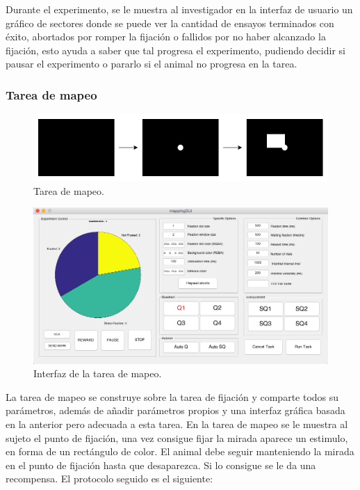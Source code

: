 \documentclass[conference]{IEEEtran}
\begin{document}
Durante el experimento, se le muestra al investigador en la interfaz de usuario un gráfico de sectores donde se puede ver la cantidad de ensayos terminados con éxito, abortados por romper la fijación o fallidos por no haber alcanzado la fijación, esto ayuda a saber que tal progresa el experimento, pudiendo decidir si pausar el experimento o pararlo si el animal no progresa en la tarea.

\subsubsection*{Tarea de mapeo}

\begin{figure}[bp]
\centerline{\includegraphics[width=\linewidth]{figures/mapping_task}}
\caption{Tarea de mapeo.}
\label{figMapTask}
\end{figure}

\begin{figure}[tp]
\centerline{\includegraphics[width=\linewidth]{figures/mapping_gui}}
\caption{Interfaz de la tarea de mapeo.}
\label{figmappingGUI}
\end{figure}

La tarea de mapeo se construye sobre la tarea de fijación y comparte todos su parámetros, además de añadir parámetros propios y una interfaz gráfica basada en la anterior pero adecuada a esta tarea.
En la tarea de mapeo se le muestra al sujeto el punto de fijación, una vez consigue fijar la mirada aparece un estimulo, en forma de un rectángulo de color. El animal debe seguir manteniendo la mirada en el punto de fijación hasta que desaparezca. Si lo consigue se le da una recompensa.
El protocolo seguido es el siguiente:
\end{document}
